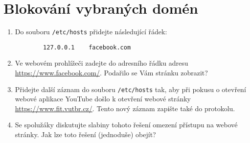 \section{Blokování vybraných domén}
\begin{enumerate}
	\item Do souboru \texttt{/etc/hosts} přidejte následující řádek:
    \begin{verbatim}
        127.0.0.1    facebook.com
    \end{verbatim}
    \item Ve webovém prohlížeči zadejte do adresního řádku adresu \url{https://www.facebook.com/}. Podařilo se Vám stránku zobrazit?
    \item Přidejte další záznam do souboru \texttt{/etc/hosts} tak, aby při pokusu o otevření webové aplikace YouTube došlo k otevření webové stránky \url{https://www.fit.vutbr.cz/}. Tento nový záznam zapište také do protokolu.
    \item Se spolužáky diskutujte slabiny tohoto řešení omezení přístupu na webové stránky. Jak lze toto řešení (jednoduše) obejít?
\end{enumerate}

